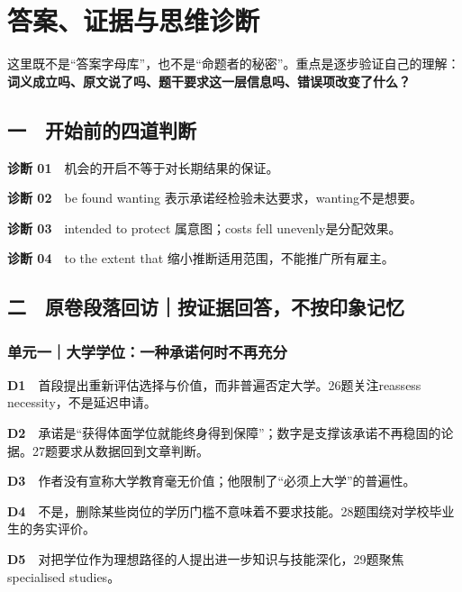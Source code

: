 \documentclass[
  11pt,
]{ctexart}
\begin{document}
\section{答案、证据与思维诊断}\label{ux7b54ux6848ux8bc1ux636eux4e0eux601dux7ef4ux8bcaux65ad}

这里既不是``答案字母库''，也不是``命题者的秘密''。重点是逐步验证自己的理解：\textbf{词义成立吗、原文说了吗、题干要求这一层信息吗、错误项改变了什么？}

\subsection{一　开始前的四道判断}\label{ux4e00-ux5f00ux59cbux524dux7684ux56dbux9053ux5224ux65ad}

\textbf{诊断 01}　机会的开启不等于对长期结果的保证。

\textbf{诊断 02}　be found wanting
表示承诺经检验未达要求，wanting不是想要。

\textbf{诊断 03}　intended to protect 属意图；costs fell
unevenly是分配效果。

\textbf{诊断 04}　to the extent that
缩小推断适用范围，不能推广所有雇主。

\subsection{二　原卷段落回访｜按证据回答，不按印象记忆}\label{ux4e8c-ux539fux5377ux6bb5ux843dux56deux8bbfux6309ux8bc1ux636eux56deux7b54ux4e0dux6309ux5370ux8c61ux8bb0ux5fc6}

\subsubsection{单元一｜大学学位：一种承诺何时不再充分}\label{ux5355ux5143ux4e00ux5927ux5b66ux5b66ux4f4dux4e00ux79cdux627fux8bfaux4f55ux65f6ux4e0dux518dux5145ux5206-1}

\textbf{D1}　首段提出重新评估选择与价值，而非普遍否定大学。26题关注reassess
necessity，不是延迟申请。

\textbf{D2}　承诺是``获得体面学位就能终身得到保障''；数字是支撑该承诺不再稳固的论据。27题要求从数据回到文章判断。

\textbf{D3}　作者没有宣称大学教育毫无价值；他限制了``必须上大学''的普遍性。

\textbf{D4}　不是，删除某些岗位的学历门槛不意味着不要求技能。28题围绕对学校毕业生的务实评价。

\textbf{D5}　对把学位作为理想路径的人提出进一步知识与技能深化，29题聚焦specialised
studies。
\end{document}
